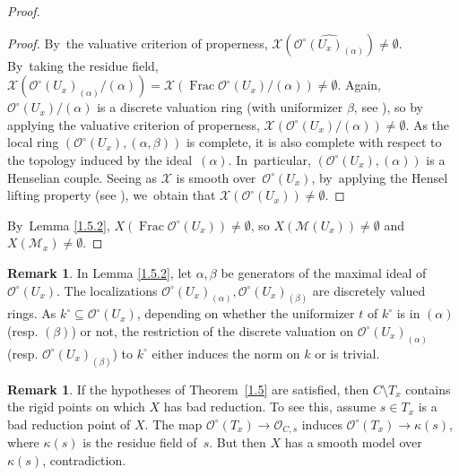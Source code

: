 \documentclass[10pt]{amsart}
\DeclareMathOperator{\Frac}{Frac}
\let\backslash\setminus
\theoremstyle{definition}
\newtheorem{rem}[thm]{Remark}
\begin{document}
\begin{proof}
\begin{proof}
By~the valuative criterion of properness, $\mathcal{X}(\widehat{\mathcal{O}^{\circ}(U_x)_{(\alpha)}}) \neq \emptyset$. By~taking the residue field, $\mathcal{X}(\mathcal{O}^{\circ}(U_x)_{(\alpha)}/(\alpha))=\mathcal{X}(\Frac \mathcal{O}^{\circ}(U_x)/(\alpha)) \neq \emptyset$.
Again, $\mathcal{O}^{\circ}(U_x)/(\alpha)$ is a discrete valuation ring (with uniformizer $\beta$, see \cite[Tag\,00NQ]{stacks}), so by applying the valuative criterion of properness, $\mathcal{X}(\mathcal{O}^{\circ}(U_x)/(\alpha)) \neq \emptyset$.
As the local ring $(\mathcal{O}^{\circ}(U_x), (\alpha, \beta))$ is complete, it is also complete with respect to the topology induced by the ideal~$(\alpha)$. In~particular, $(\mathcal{O}^{\circ}(U_x), (\alpha))$ is a Henselian couple. Seeing as $\mathcal{X}$ is smooth over~$\mathcal{O}^{\circ}(U_x)$, by~apply\-ing the Hensel lifting property (see \cite[Th.\,I.8]{gruson}), we~obtain that ${\mathcal{X}(\mathcal{O}^{\circ}(U_x)) \neq \emptyset}$.
\end{proof}

By~Lemma \ref{1.5.2}, $X(\Frac \mathcal{O}^{\circ}(U_x)) \neq \emptyset$, so $X(\mathscr{M}(U_x)) \neq \emptyset$ and ${X(\mathscr{M}_x) \neq \emptyset}$.
\end{proof}

\begin{rem} \label{1.6bis}
In Lemma \ref{1.5.2}, let $\alpha, \beta$ be generators of the maximal ideal of $\mathcal{O}^{\circ}(U_x)$. The localizations $\mathcal{O}^{\circ}(U_x)_{(\alpha)}, \mathcal{O}^{\circ}(U_x)_{(\beta)}$ are discretely valued rings. As ${k^{\circ} \subseteq \mathcal{O}^{\circ}(U_x)}$, depending on whether the uniformizer $t$ of $k^{\circ}$ is in $(\alpha)$ (resp. $(\beta)$) or not, the restriction of the discrete valuation on $\mathcal{O}^{\circ}(U_x)_{(\alpha)}$ (resp. $\mathcal{O}^{\circ}(U_x)_{(\beta)}$) to $k^{\circ}$ either induces the norm on $k$ or is trivial.
\end{rem}

\begin{rem} \label{1.6.1}
If the hypotheses of Theorem~\ref{1.5} are satisfied, then $C \backslash T_x$ contains the rigid points on which $X$ has bad reduction. To see this, assume $s \in T_x$ is a bad reduction point of $X$. The map $\mathcal{O}^{\circ}(T_x) \to \mathcal{O}_{C,s}$ induces $\mathcal{O}^{\circ}(T_x) \to \kappa(s)$, where $\kappa(s)$ is the residue field of~$s$. But then $X$ has a smooth model over~$\kappa(s)$, contradiction.
\end{rem}
\end{document}
